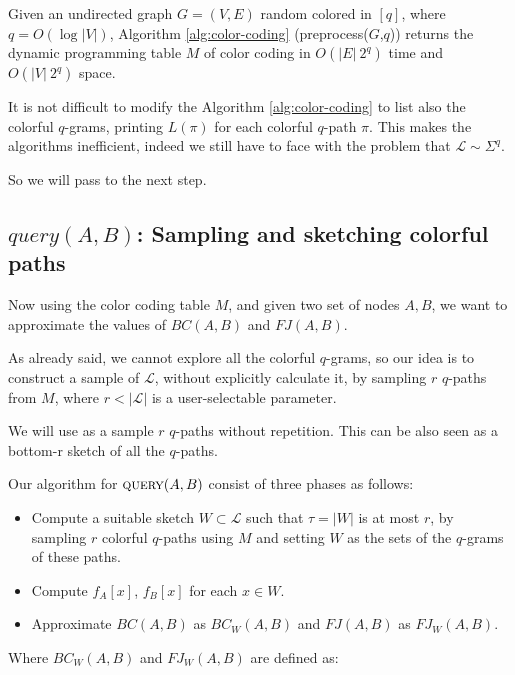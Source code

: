 \begin{lemma}
	Given an undirected graph $G=(V, E)$ random colored in $[q]$, where $q = O(\log |V|)$, Algorithm \ref{alg:color-coding} (preprocess($G$,$q$)) returns the dynamic programming table $M$ of color coding in $O(|E|\ 2^{q})$ time and $O(|V|\ 2^{q})$ space. 
\end{lemma}

\bigskip

It is not difficult to modify the Algorithm \ref{alg:color-coding} to list also the colorful $q$-grams, printing $L(\pi)$ for each colorful $q$-path $\pi$. This makes the algorithms inefficient, indeed we still have to face with the problem that $\mathcal{L} \sim \Sigma^{q}$.\bigskip

So we will pass to the next step.

\subsection*{$query(A,B)$: Sampling and sketching colorful paths}

Now using the color coding table $M$, and given two set of nodes $A, B$, we want to approximate the values of $BC(A,B)$ and $FJ(A,B)$.\bigskip

As already said, we cannot explore all the colorful $q$-grams, so our idea is to construct a sample of $\mathcal{L}$, without explicitly calculate it, by sampling $r$ $q$-paths from $M$, where $r < |\mathcal{L}|$ is a user-selectable parameter.

We will use as a sample $r$ $q$-paths  without repetition. This can be also seen as a bottom-r sketch of all the $q$-paths.\bigskip 

\clearpage

Our algorithm for $\textsc{query}(A,B)$ consist of three phases as follows:

\begin{itemize}
	\item Compute a suitable sketch $W \subset \mathcal{L}$ such that $\tau = |W|$ is at most $r$, by sampling $r$ colorful $q$-paths using $M$ and setting $W$ as the sets of the $q$-grams of these paths.
	\item Compute $f_{A}[x]$, $f_{B}[x]$ for each $x \in W$.
	\item Approximate $BC(A,B)$ as $BC_{W}(A,B)$ and $FJ(A,B)$ as $FJ_{W}(A,B)$.
\end{itemize}

Where $BC_{W}(A,B)$ and $FJ_{W}(A,B)$ are defined as:

